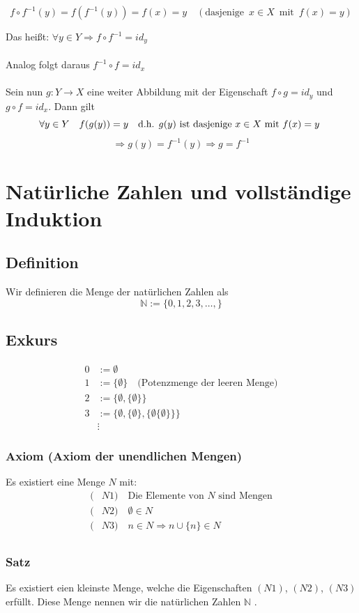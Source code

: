 \[
f \circ f^{-1}(y) = f(f^{-1}(y)) = f(x) = y \quad (\text{dasjenige} \enspace x \in X \enspace \text{mit} \enspace f(x)=y)
\]

Das heißt: \( \forall y \in Y \Rightarrow f \circ f^{-1}=id_y \) \\
\\
Analog folgt daraus \( f^{-1} \circ f = id_x\)
\\
\\
Sein nun \( g: Y \rightarrow X \) eine weiter Abbildung mit der Eigenschaft \( f \circ g = id_y \) und \( g \circ f = id_x \). Dann gilt 
\[
\forall y \in Y \quad f(g(y))=y \quad \text{d.h. \( g(y) \) ist dasjenige \( x \in X \) mit \( f(x)=y \) }
\]
\[
\Longrightarrow g(y)=f^{-1}(y) \Rightarrow g=f^{-1}
\]
\newpage

\section{Natürliche Zahlen und vollständige Induktion}
\subsection{Definition}
Wir definieren die Menge der natürlichen Zahlen als \[ \mathbb{N} := \{ 0, 1, 2, 3, \ldots, \} \]
\subsection{Exkurs}
\begin{align*}
0 &:= \emptyset \\
1 &:= \{ \emptyset \} \quad \text{(Potenzmenge der leeren Menge)} \\
2 &:= \{ \emptyset, \{ \emptyset \} \} \\
3 &:= \{ \emptyset, \{ \emptyset \}, \{ \emptyset \{ \emptyset \} \} \} \\
&\vdots
\end{align*}
\subsubsection{Axiom (Axiom der unendlichen Mengen)}
Es existiert eine Menge \(N\) mit:
\begin{align*}
(&N1) \quad \text{Die Elemente von \(N\) sind Mengen} \\
(&N2) \quad \emptyset \in N \\
(&N3) \quad n \in N \Longrightarrow n \cup \{n\} \in N \\
\end{align*}
\subsubsection{Satz}
Es existiert eien kleinste Menge, welche die Eigenschaften \((N1)\), \((N2)\), \((N3)\) erfüllt. Diese Menge nennen wir die natürlichen Zahlen \( \mathbb{N}\) .
